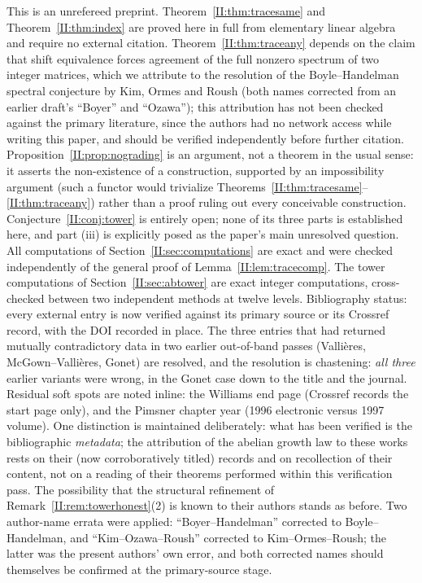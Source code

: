 This is an unrefereed preprint. Theorem~\ref{II:thm:tracesame} and Theorem~\ref{II:thm:index}
are proved here in full from elementary linear algebra and require no external citation.
Theorem~\ref{II:thm:traceany} depends on the claim that shift equivalence forces agreement
of the full nonzero spectrum of two integer matrices, which we attribute to the
resolution of the Boyle--Handelman spectral conjecture by Kim, Ormes and Roush (both
names corrected from an earlier draft's ``Boyer'' and ``Ozawa''); this
attribution has not been checked against the primary literature, since the authors had
no network access while writing this paper, and should be verified independently before
further citation. Proposition~\ref{II:prop:nograding} is an argument, not a theorem in the
usual sense: it asserts the non-existence of a construction, supported by an
impossibility argument (such a functor would trivialize
Theorems~\ref{II:thm:tracesame}--\ref{II:thm:traceany}) rather than a proof ruling out every
conceivable construction. Conjecture~\ref{II:conj:tower} is entirely open; none of its three
parts is established here, and part (iii) is explicitly posed as the paper's main
unresolved question. All computations of Section~\ref{II:sec:computations} are exact and
were checked independently of the general proof of Lemma~\ref{II:lem:tracecomp}. The tower
computations of Section~\ref{II:sec:abtower} are exact integer computations, cross-checked
between two independent methods at twelve levels. Bibliography status: every external
entry is now verified against its primary source or its Crossref record, with the DOI
recorded in place. The three entries that had returned mutually contradictory data in
two earlier out-of-band passes (Vallières, McGown--Vallières, Gonet) are resolved, and
the resolution is chastening: \emph{all three} earlier variants were wrong, in the
Gonet case down to the title and the journal. Residual soft spots are noted inline:
the Williams end page (Crossref records the start page only), and the
Pimsner chapter year (1996 electronic versus 1997 volume). One distinction is
maintained deliberately: what has been verified is the bibliographic \emph{metadata};
the attribution of the abelian growth law to these works rests on their (now
corroboratively titled) records and on recollection of their content, not on a reading
of their theorems performed within this verification pass. The possibility that the
structural refinement of Remark~\ref{II:rem:towerhonest}(2) is known to their authors
stands as before. Two author-name errata were applied: ``Boyer--Handelman'' corrected to
Boyle--Handelman, and ``Kim--Ozawa--Roush'' corrected to Kim--Ormes--Roush; the latter
was the present authors' own error, and both corrected names should themselves be
confirmed at the primary-source stage.
